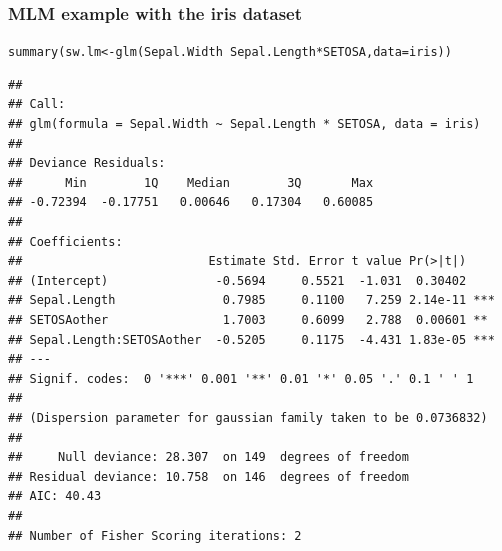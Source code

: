 \documentclass[xcolor=table, xcolor=dvipsnames]{beamer}\usepackage[]{graphicx}\usepackage[]{color}
\makeatletter
\newcommand{\hlopt}[1]{\textcolor[rgb]{0,0,0}{#1}}
\newcommand{\hlstd}[1]{\textcolor[rgb]{0,0,0}{#1}}
\newcommand{\hlkwb}[1]{\textcolor[rgb]{0,0,0}{#1}}
\newcommand{\hlkwc}[1]{\textcolor[rgb]{1,0,1}{#1}}
\newcommand{\hlkwd}[1]{\textcolor[rgb]{0,0,1}{#1}}
\newenvironment{kframe}{%
 \def\at@end@of@kframe{}%
 \ifinner\ifhmode%
  \def\at@end@of@kframe{\end{minipage}}%
  \begin{minipage}{\columnwidth}%
 \fi\fi%
 \def\FrameCommand##1{\hskip\@totalleftmargin \hskip-\fboxsep
 \colorbox{shadecolor}{##1}\hskip-\fboxsep
     \hskip-\linewidth \hskip-\@totalleftmargin \hskip\columnwidth}%
 \MakeFramed {\advance\hsize-\width
   \@totalleftmargin\z@ \linewidth\hsize
   \@setminipage}}%
 {\par\unskip\endMakeFramed%
 \at@end@of@kframe}
\newenvironment{knitrout}{}{} %
\makeatother
\begin{document}
\begin{frame}[fragile]\frametitle{MLM example with the iris dataset}

\begin{knitrout}\tiny
{}\color{fgcolor}\begin{kframe}
\begin{alltt}
\hlkwd{summary}\hlstd{(sw.lm} \hlkwb{<-} \hlkwd{glm}\hlstd{(Sepal.Width} \hlopt{~} \hlstd{Sepal.Length} \hlopt{*} \hlstd{SETOSA,} \hlkwc{data}\hlstd{=iris))}
\end{alltt}
\begin{verbatim}
## 
## Call:
## glm(formula = Sepal.Width ~ Sepal.Length * SETOSA, data = iris)
## 
## Deviance Residuals: 
##      Min        1Q    Median        3Q       Max  
## -0.72394  -0.17751   0.00646   0.17304   0.60085  
## 
## Coefficients:
##                          Estimate Std. Error t value Pr(>|t|)    
## (Intercept)               -0.5694     0.5521  -1.031  0.30402    
## Sepal.Length               0.7985     0.1100   7.259 2.14e-11 ***
## SETOSAother                1.7003     0.6099   2.788  0.00601 ** 
## Sepal.Length:SETOSAother  -0.5205     0.1175  -4.431 1.83e-05 ***
## ---
## Signif. codes:  0 '***' 0.001 '**' 0.01 '*' 0.05 '.' 0.1 ' ' 1
## 
## (Dispersion parameter for gaussian family taken to be 0.0736832)
## 
##     Null deviance: 28.307  on 149  degrees of freedom
## Residual deviance: 10.758  on 146  degrees of freedom
## AIC: 40.43
## 
## Number of Fisher Scoring iterations: 2
\end{verbatim}
\end{kframe}
\end{knitrout}

\end{frame}

\end{document}
